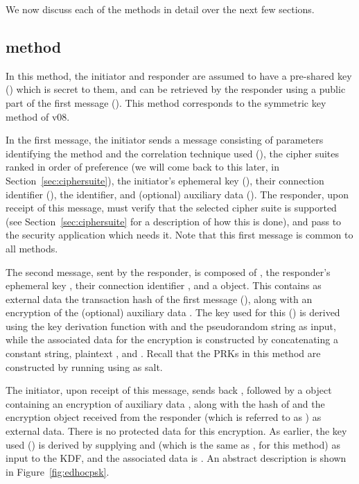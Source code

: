 {We now discuss each of the \mEdhoc{} methods in detail over the next few sections.

\subsection{\mPskPsk{} method}
In this method, the initiator and responder are assumed to have a pre-shared key (\mPsk) which is secret to them, and can be retrieved by the responder using a public part of the first message (\mIDPsk). This method corresponds to the symmetric key method of \mEdhoc{} v08. 

In the first message, the initiator sends a message consisting of parameters identifying the method and the correlation technique used (\mMethod), the cipher suites ranked in order of preference (we will come back to this later, in Section~\ref{sec:ciphersuite}), the initiator's ephemeral key (\mGx), their connection identifier (\mCi), the \mIDPsk identifier, and (optional) auxiliary data (\mADone). The responder, upon receipt of this message, must verify that the selected cipher suite is supported (see Section~\ref{sec:ciphersuite} for a description of how this is done),  and pass \mADone to the security application which needs it. Note that this first message is common to all \mEdhoc{} methods.

The second message, sent by the responder, is composed of \mCi, the responder's ephemeral key \mGy, their connection identifier \mCr, and a \mCose{} object. This contains as external data the transaction hash of the first message (\mTHtwo), along with an \mAead{} encryption of the (optional) auxiliary data \mADtwo. The key used for this (\mKtwoae) is derived using the \mEdhoc{} key derivation function with \mTHtwo and the pseudorandom string \mPRKtwo as input, while the associated data for the \mAead{} encryption is constructed by concatenating a constant string, plaintext \mhplain, and \mTHtwo. Recall that the PRKs in this method are constructed by running \mHkdfExtract{} using \mPsk{} as salt. 

The initiator, upon receipt of this message, sends back \mCr, followed by a \mCose{} object containing an \mAead{} encryption of auxiliary data \mADthree, along with the hash of \mTHtwo and the encryption object received from the responder (which is referred to as \mTHthree) as external data. There is no protected data for this encryption. As earlier, the key used (\mKthreeae) is derived by supplying \mTHthree and \mPRKthree (which is the same as \mPRKtwo, for this method) as input to the KDF, and the associated data is \mTHthree. An abstract description is shown in Figure~\ref{fig:edhocpsk}.

}
